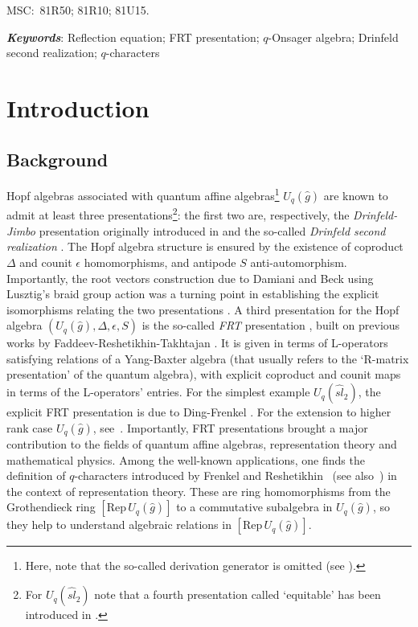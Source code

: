 \documentclass[11pt]{amsart}
\numberwithin{equation}{section}
\numberwithin{equation}{section}
\begin{document}
	\vskip -0.7cm
	
	{\small MSC:\  81R50; 81R10;  81U15.}
	
	
	{{\small  {\it \bf Keywords}: Reflection equation; FRT presentation; $q$-Onsager algebra;  Drinfeld second realization; $q$-characters}}
	
	
	\vspace{-0.3cm}
    \setcounter{tocdepth}{1}
	\tableofcontents
	
	\section{Introduction}
\subsection{Background} Hopf algebras associated with
quantum affine algebras\footnote{Here, note that the so-called derivation generator is omitted (see \cite[Rem.\,2, p. 393]{CP95}).}  $U_q(\widehat{g})$ are known to admit at least three presentations\footnote{For $U_q(\widehat{sl}_2)$ note that a fourth presentation called `equitable' has been introduced in \cite{IT03}.}: the first two are, respectively, the  {\it Drinfeld-Jimbo} presentation originally introduced in \cite{Jim,Dr0}
and the so-called {\it Drinfeld second realization} \cite{Dr88}. The Hopf algebra structure is ensured by the existence of coproduct $\Delta$ and counit $\epsilon$ homomorphisms, and antipode $S$ anti-automorphism.
Importantly, the root vectors construction due to Damiani and Beck \cite{Dam93,Beck} using Lusztig's braid group action was a turning point in establishing the explicit isomorphisms relating the two presentations \cite{Beck,Ji,Da14}. A third presentation for the Hopf algebra $(U_q(\widehat{g}),\Delta,\epsilon,S)$ is the so-called {\it FRT} presentation \cite{RS90}, built on previous works  by Faddeev-Reshetikhin-Takhtajan
\cite{FRT89}.  It is given in terms of L-operators satisfying relations of a Yang-Baxter algebra (that usually refers to the `R-matrix presentation' of the quantum algebra), with explicit coproduct and counit maps in terms of the L-operators' entries. For the simplest example $U_q(\widehat{sl}_2)$, the explicit FRT presentation is due to Ding-Frenkel \cite{DF93}. For the extension to higher rank case $U_q(\widehat{g})$, see~\cite{HM97,JLM,JLMBD,LP21}.  Importantly, FRT presentations brought a major contribution to the fields of quantum affine algebras, representation theory and mathematical physics. Among the well-known applications, one finds the definition of $q$-characters introduced by Frenkel and Reshetikhin~\cite{FR99} (see also~\cite{FMu99}) in the context of representation theory.  These are ring homomorphisms from the Grothendieck ring $[\mathrm{Rep}\,U_q(\widehat{g})]$ to a commutative subalgebra in $U_q(\widehat{g})$, so they help to understand algebraic relations in $[\mathrm{Rep}\,U_q(\widehat{g})]$.
\end{document}
